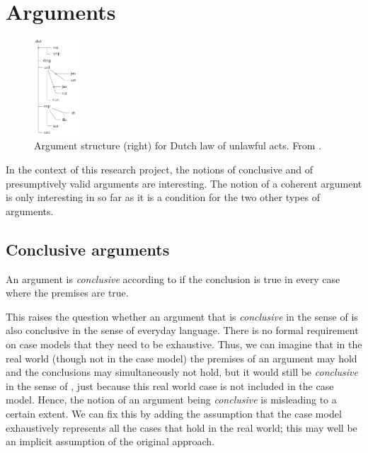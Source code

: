 \label{sec:arguments}
\section{Arguments}

\begin{figure}[htb]
        \centering
        \includegraphics[width=0.15\textwidth]{images/argument.png}
        \caption{Argument structure (right) for Dutch law of unlawful acts. From \citet[fig.~5]{verheijArgumentsGoodArtificial2018}.}
        \label{fig:argument}
\end{figure}

In the context of this research project, the notions of conclusive and of presumptively valid arguments are interesting. The notion of a coherent argument is only interesting in so far as it is a condition for the two other types of arguments. 

\subsection*{Conclusive arguments}
An argument is \textit{conclusive} according to \citet{verheijProofProbabilities2017} if the conclusion is true in every case where the premises are true.

This raises the question whether an argument that is \textit{conclusive} in the sense of \citet{verheijProofProbabilities2017} is also conclusive in the sense of everyday language. There is no formal requirement on case models that they need to be exhaustive. Thus, we can imagine that in the real world (though not in the case model) the premises of an argument may hold and the conclusions may simultaneously not hold, but it would still be \textit{conclusive}  in the sense of \cite{verheijProofProbabilities2017}, just because this real world case is not included in the case model. Hence, the notion of an argument being \textit{conclusive} is misleading to a certain extent. We can fix this by adding the assumption that the case model exhaustively represents all the cases that hold in the real world; this may well be an implicit assumption of the original approach. 

